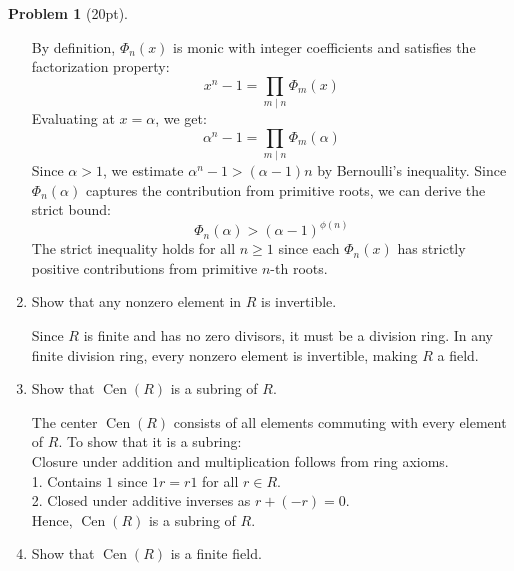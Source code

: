 \documentclass[12pt]{article}
\theoremstyle{definition}
\newtheorem{problem}{Problem}
\DeclareMathOperator{\Cen}{Cen}
\begin{document}
\begin{problem}[20pt]
\begin{enumerate}[label=\arabic*.]
\begin{solution}
                  By definition, $\Phi_n(x)$ is monic with integer coefficients and satisfies the factorization property:
                  \[
                  x^n - 1 = \prod_{m \mid n} \Phi_m(x)
                  \]
                  Evaluating at $x = \alpha$, we get:
                  \[
                  \alpha^n - 1 = \prod_{m \mid n} \Phi_m(\alpha)
                  \]
                  Since $\alpha > 1$, we estimate $\alpha^n - 1 > (\alpha - 1)n$ by Bernoulli’s inequality. Since $\Phi_n(\alpha)$ captures the contribution from primitive roots, we can derive the strict bound:
                  \[
                  \Phi_n(\alpha) > (\alpha - 1)^{\phi(n)}
                  \]
                  The strict inequality holds for all $n \geq 1$ since each $\Phi_n(x)$ has strictly positive contributions from primitive $n$-th roots.
               
            \end{solution}

            \item Show that any nonzero element in $R$ is invertible.
            
            \begin{solution}
                  Since $R$ is finite and has no zero divisors, it must be a division ring. In any finite division ring, every nonzero element is invertible, making $R$ a field.

            \end{solution}

            \item Show that $\Cen(R)$ is a subring of $R$.
            
            \begin{solution}
                  The center $\Cen(R)$ consists of all elements commuting with every element of $R$. To show that it is a subring:\\
                  Closure under addition and multiplication follows from ring axioms.\\
                  1. Contains $1$ since $1r = r1$ for all $r \in R$.\\
                  2. Closed under additive inverses as $r + (-r) = 0$.\\
                  Hence, $\Cen(R)$ is a subring of $R$.
               
            \end{solution}

            \item Show that $\Cen(R)$ is a finite field.
            

\end{enumerate}
\end{problem}
\end{document}
